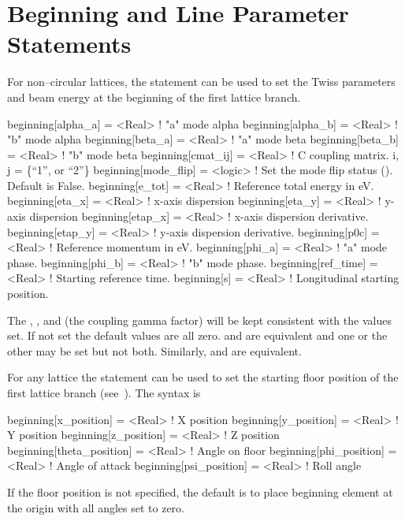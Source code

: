 \section{Beginning and Line Parameter Statements}
\label{s:beginning}

For non--circular lattices, the  statement can be used to set the Twiss parameters and
beam energy at the beginning of the first lattice branch.
\begin{example}
  beginning[alpha_a]   = <Real>  ! "a" mode alpha
  beginning[alpha_b]   = <Real>  ! "b" mode alpha
  beginning[beta_a]    = <Real>  ! "a" mode beta
  beginning[beta_b]    = <Real>  ! "b" mode beta
  beginning[cmat_ij]   = <Real>  ! C coupling matrix. i, j = \{``1'', or ``2''\} 
  beginning[mode_flip] = <logic> ! Set the mode flip status (). Default is False.
  beginning[e_tot]     = <Real>  ! Reference total energy in eV.
  beginning[eta_x]     = <Real>  ! x-axis dispersion
  beginning[eta_y]     = <Real>  ! y-axis dispersion
  beginning[etap_x]    = <Real>  ! x-axis dispersion derivative.
  beginning[etap_y]    = <Real>  ! y-axis dispersion derivative.
  beginning[p0c]       = <Real>  ! Reference momentum in eV.
  beginning[phi_a]     = <Real>  ! "a" mode phase.
  beginning[phi_b]     = <Real>  ! "b" mode phase.
  beginning[ref_time]  = <Real>  ! Starting reference time.
  beginning[s]         = <Real>  ! Longitudinal starting position.
\end{example}
The , , and  (the coupling gamma factor) will be kept consistent
with the values set. If not set the default values are all zero.   and
 are equivalent and one or the other may be set but not both. Similarly,
 and  are equivalent.

For any lattice the  statement can be used to set the starting floor position of the
first lattice branch (see~). The syntax is
\begin{example}
  beginning[x_position]     = <Real>  ! X position
  beginning[y_position]     = <Real>  ! Y position
  beginning[z_position]     = <Real>  ! Z position
  beginning[theta_position] = <Real>  ! Angle on floor
  beginning[phi_position]   = <Real>  ! Angle of attack
  beginning[psi_position]   = <Real>  ! Roll angle
\end{example}
If the floor position is not specified, the default is to place
beginning element at the origin with all angles set to zero.

